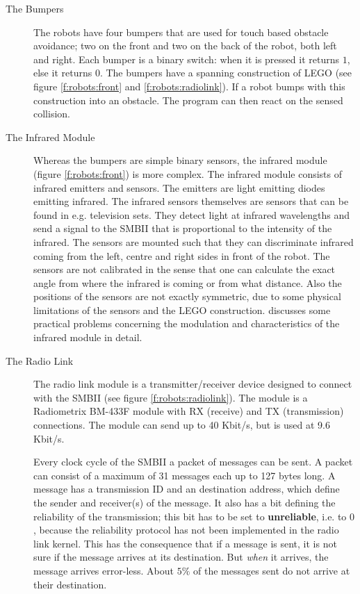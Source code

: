 \begin{description}
\item[The Bumpers] The robots have four bumpers that are used for touch based obstacle avoidance; two on the front and two on the back of the robot, both left and right. Each bumper is a binary switch: when it is pressed it returns $1$, else it returns $0$. The bumpers have a spanning construction of LEGO (see figure \ref{f:robots:front} and \ref{f:robots:radiolink}). If a robot bumps with this construction into an obstacle. The program can then react on the sensed collision.
\item[The Infrared Module] Whereas the bumpers are simple binary sensors, the infrared module (figure \ref{f:robots:front}) is more complex. The infrared module consists of infrared emitters and sensors. The emitters are light emitting diodes emitting infrared. The infrared sensors themselves are sensors that can be found in e.g. television sets. They detect light at infrared wavelengths and send a signal to the SMBII that is proportional to the intensity of the infrared. The sensors are mounted such that they can discriminate infrared coming from the left, centre and right sides in front of the robot. The sensors are not calibrated in the sense that one can calculate the exact angle from where the infrared is coming or from what distance. Also the  positions of the sensors are not exactly symmetric, due to some physical limitations of the sensors and the LEGO construction. \citet{vogt:1997} discusses some practical problems concerning the modulation and characteristics of the infrared module in detail.


\item[The Radio Link] The radio link module is a transmitter/receiver device designed to connect with the SMBII (see figure \ref{f:robots:radiolink}). The module is a Radiometrix BM-433F module with RX (receive) and TX (transmission) connections. The module can send up to 40 Kbit/s, but is used at 9.6 Kbit/s. 

Every clock cycle of the SMBII a packet of messages can be sent. A packet can consist of a maximum of 31 messages each up to 127 bytes long. A message has a transmission ID and an destination address, which define the sender and receiver(s) of the message.  It also has a bit defining the reliability of the transmission; this bit has to be set to {\bf unreliable}, i.e. to $0$, because the reliability protocol has not been implemented in the radio link kernel. This has the consequence that if a message is sent, it is not sure if the message arrives at its destination. But {\em when} it arrives, the message arrives error-less. About $5\%$ of the messages sent do not arrive at their destination.


\end{description}

